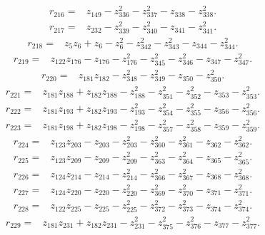 \begin{align*}
 r_{216}={}&z_{149}-z_{336}^{2}-z_{337}^{2}-z_{338}-z_{338}^{2} .
\end{align*}
\begin{align*}
 r_{217}={}&z_{232}-z_{339}^{2}-z_{340}^{2}-z_{341}-z_{341}^{2} .
\end{align*}
\begin{align*}
 r_{218}={}&z_{5}z_{6}+z_{6}-z_{6}^{2}-z_{342}^{2}-z_{343}^{2}-z_{344}-z_{344}^{2} .
\end{align*}
\begin{align*}
 r_{219}={}&z_{122}z_{176}-z_{176}-z_{176}^{2}-z_{345}^{2}-z_{346}^{2}-z_{347}-z_{347}^{2} .
\end{align*}
\begin{align*}
 r_{220}={}&z_{181}z_{182}-z_{348}^{2}-z_{349}^{2}-z_{350}-z_{350}^{2} .
\end{align*}
\begin{align*}
 r_{221}={}&z_{181}z_{188}+z_{182}z_{188}-z_{188}^{2}-z_{351}^{2}-z_{352}^{2}-z_{353}-z_{353}^{2} .
\end{align*}
\begin{align*}
 r_{222}={}&z_{181}z_{193}+z_{182}z_{193}-z_{193}^{2}-z_{354}^{2}-z_{355}^{2}-z_{356}-z_{356}^{2} .
\end{align*}
\begin{align*}
 r_{223}={}&z_{181}z_{198}+z_{182}z_{198}-z_{198}^{2}-z_{357}^{2}-z_{358}^{2}-z_{359}-z_{359}^{2} .
\end{align*}
\begin{align*}
 r_{224}={}&z_{123}z_{203}-z_{203}-z_{203}^{2}-z_{360}^{2}-z_{361}^{2}-z_{362}-z_{362}^{2} .
\end{align*}
\begin{align*}
 r_{225}={}&z_{123}z_{209}-z_{209}-z_{209}^{2}-z_{363}^{2}-z_{364}^{2}-z_{365}-z_{365}^{2} .
\end{align*}
\begin{align*}
 r_{226}={}&z_{124}z_{214}-z_{214}-z_{214}^{2}-z_{366}^{2}-z_{367}^{2}-z_{368}-z_{368}^{2} .
\end{align*}
\begin{align*}
 r_{227}={}&z_{124}z_{220}-z_{220}-z_{220}^{2}-z_{369}^{2}-z_{370}^{2}-z_{371}-z_{371}^{2} .
\end{align*}
\begin{align*}
 r_{228}={}&z_{122}z_{225}-z_{225}-z_{225}^{2}-z_{372}^{2}-z_{373}^{2}-z_{374}-z_{374}^{2} .
\end{align*}
\begin{align*}
 r_{229}={}&z_{181}z_{231}+z_{182}z_{231}-z_{231}^{2}-z_{375}^{2}-z_{376}^{2}-z_{377}-z_{377}^{2} .
\end{align*}
